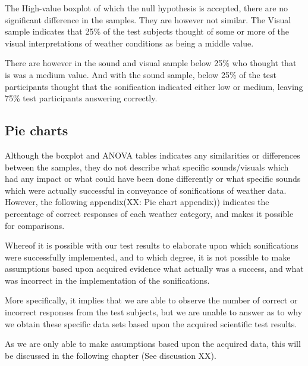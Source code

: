 The High-value boxplot of which the null hypothesis is accepted, there are no significant difference in the samples. 
They are however not similar.
The Visual sample indicates that 25\% of the test subjects thought of some or more of the visual interpretations of weather conditions as being a middle value.

There are however in the sound and visual sample below 25\% who thought that is was a medium value. 
And with the sound sample, below 25\% of the test participants thought that the sonification indicated either low or medium, leaving 75\% test participants answering correctly.


\FloatBarrier
\subsection{Pie charts} %
\label{sub:pie_charts}

Although the boxplot and ANOVA tables indicates any similarities or differences between the samples, they do not describe what specific sounds/visuals which had any impact or what could have been done differently or what specific sounds which were actually successful in conveyance of sonifications of weather data.
However, the following appendix(XX: Pie chart appendix)) indicates the percentage of correct responses of each weather category, and makes it possible for comparisons. 


Whereof it is possible with our test results to elaborate upon which sonifications were successfully implemented, and to which degree, it is not possible to make assumptions based upon acquired evidence what actually was a success, and what was incorrect in the implementation of the sonifications.

More specifically, it implies that we are able to observe the number of correct or incorrect responses from the test subjects, but we are unable to answer as to why we obtain these specific data sets based upon the acquired scientific test results.

As we are only able to make assumptions based upon the acquired data, this will be discussed in the following chapter (See discussion XX).



